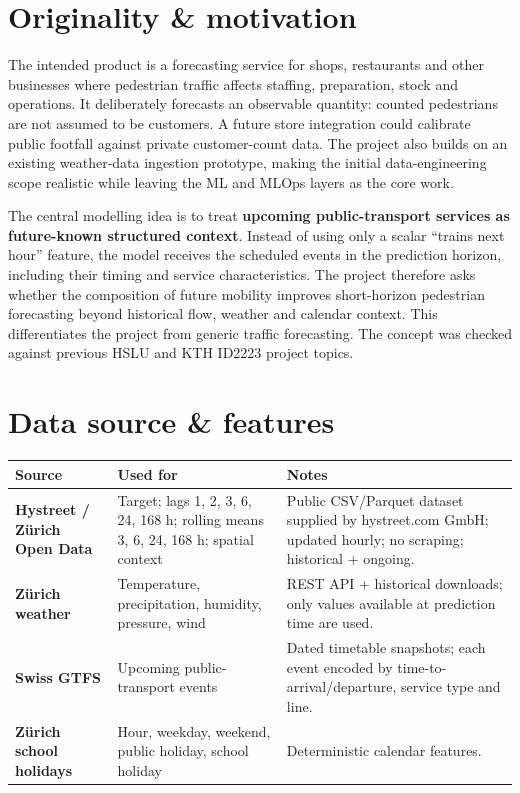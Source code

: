 \documentclass[10pt,a4paper]{article}
\begin{document}
\section{Originality \& motivation}
The intended product is a forecasting service for shops, restaurants and other businesses where pedestrian traffic affects staffing, preparation, stock and operations. It deliberately forecasts an observable quantity: counted pedestrians are not assumed to be customers. A future store integration could calibrate public footfall against private customer-count data. The project also builds on an existing weather-data ingestion prototype, making the initial data-engineering scope realistic while leaving the ML and MLOps layers as the core work.

The central modelling idea is to treat \textbf{upcoming public-transport services as future-known structured context}. Instead of using only a scalar ``trains next hour'' feature, the model receives the scheduled events in the prediction horizon, including their timing and service characteristics. The project therefore asks whether the composition of future mobility improves short-horizon pedestrian forecasting beyond historical flow, weather and calendar context. This differentiates the project from generic traffic forecasting. The concept was checked against previous HSLU and KTH ID2223 project topics.

\section{Data source \& features}
\begin{center}
\fontsize{8.1}{9.1}\selectfont
\renewcommand{\arraystretch}{1.06}
\begin{tabular}{@{}>{\bfseries}p{28mm}p{55mm}p{42mm}@{}}
\toprule
Source & Used for & Notes \\
\midrule
Hystreet / Z\"urich Open Data & Target; lags 1, 2, 3, 6, 24, 168 h; rolling means 3, 6, 24, 168 h; spatial context & Public CSV/Parquet dataset supplied by hystreet.com GmbH; updated hourly; no scraping; historical + ongoing. \\
Z\"urich weather & Temperature, precipitation, humidity, pressure, wind & REST API + historical downloads; only values available at prediction time are used. \\
Swiss GTFS & Upcoming public-transport events & Dated timetable snapshots; each event encoded by time-to-arrival/departure, service type and line. \\
Z\"urich school holidays & Hour, weekday, weekend, public holiday, school holiday & Deterministic calendar features. \\
\bottomrule
\end{tabular}
\end{center}
\end{document}
